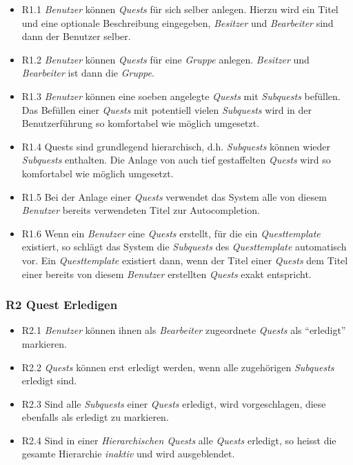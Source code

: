 \documentclass{article}
\begin{document}
\begin{itemize}
	\item{R1.1} \textit{Benutzer} können \textit{Quests} für sich selber anlegen. Hierzu wird ein Titel und eine optionale Beschreibung eingegeben, \textit{Besitzer} und \textit{Bearbeiter} sind dann der Benutzer selber.
	\item{R1.2} \textit{Benutzer} können \textit{Quests} für eine \textit{Gruppe} anlegen. \textit{Besitzer} und \textit{Bearbeiter} ist dann die \textit{Gruppe}.
	\item{R1.3} \textit{Benutzer} können eine soeben angelegte \textit{Quests} mit \textit{Subquests} befüllen. Das Befüllen einer \textit{Quests} mit potentiell vielen \textit{Subquests} wird in der Benutzerführung so komfortabel wie möglich umgesetzt.
	\item{R1.4} Quests sind grundlegend hierarchisch, d.h. \textit{Subquests} können wieder \textit{Subquests} enthalten. Die Anlage von auch tief gestaffelten \textit{Quests} wird so komfortabel wie möglich umgesetzt.
	\item{R1.5} Bei der Anlage einer \textit{Quests} verwendet das System alle von diesem \textit{Benutzer} bereits verwendeten Titel zur Autocompletion. 
	\item{R1.6} Wenn ein \textit{Benutzer} eine \textit{Quests} erstellt, für die ein \textit{Questtemplate} existiert, so schlägt das System die \textit{Subquests} des \textit{Questtemplate} automatisch vor. Ein \textit{Questtemplate} existiert dann, wenn der Titel einer \textit{Quests} dem Titel
	einer bereits von diesem \textit{Benutzer} erstellten \textit{Quests} exakt entspricht. 
\end{itemize}

\subsubsection{R2 Quest Erledigen}

\begin{itemize}
	\item{R2.1} \textit{Benutzer} können ihnen als \textit{Bearbeiter} zugeordnete \textit{Quests} als ``erledigt'' markieren. 
	\item{R2.2} \textit{Quests} können erst erledigt werden, wenn alle zugehörigen \textit{Subquests} erledigt sind. 
	\item{R2.3} Sind alle \textit{Subquests} einer \textit{Quests} erledigt, wird vorgeschlagen, diese ebenfalls als erledigt zu markieren. 
	\item{R2.4} Sind in einer \textit{Hierarchischen Quests} alle \textit{Quests} erledigt, so heisst die gesamte Hierarchie \textit{inaktiv} und wird ausgeblendet. 
\end{itemize}
\end{document}
